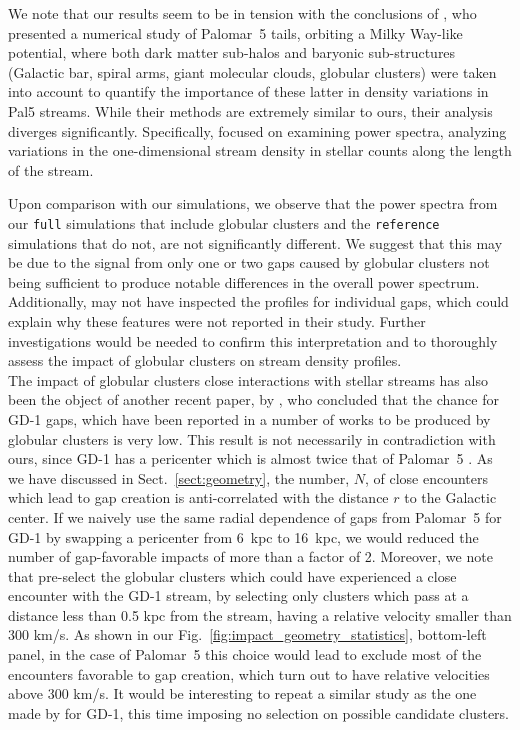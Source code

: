 \documentclass[draft]{aa}
\begin{document}
  We note that our results seem to be in tension with the conclusions of \citet{2019MNRAS.484.2009B}, who presented a numerical study of Palomar~5 tails, orbiting a Milky Way-like potential, where both dark matter sub-halos and baryonic sub-structures (Galactic bar, spiral arms, giant molecular clouds, globular clusters) were taken into account to quantify the importance of these latter in density variations in Pal5 streams. While their methods are extremely similar to ours, their analysis diverges significantly. Specifically, \citet{2019MNRAS.484.2009B} focused on examining power spectra, analyzing variations in the one-dimensional stream density in stellar counts along the length of the stream. 

  Upon comparison with our simulations, we observe that the power spectra from our \texttt{full} simulations that include globular clusters and the \texttt{reference} simulations that do not, are not significantly different. We suggest that this may be due to the signal from only one or two gaps caused by globular clusters not being sufficient to produce notable differences in the overall power spectrum. Additionally, \citet{2019MNRAS.484.2009B} may not have inspected the profiles for individual gaps, which could explain why these features were not reported in their study. Further investigations would be needed to confirm this interpretation and to thoroughly assess the impact of globular clusters on stream density profiles. \\

  The impact of globular clusters close interactions with stellar streams has also been the object of another recent paper, by \citet{2022ApJ...941..129D}, who concluded that the chance for GD-1 gaps, which have been reported in a number of works \citep[see, for example, ][]{2019ApJ...880...38B,2018MNRAS.477.1893D,2020AAS...23533607D} to be produced by globular clusters is very low. This result is not necessarily in contradiction with ours, since GD-1 has a pericenter which is almost twice that of Palomar~5 \citep[see, for example][]{2019MNRAS.486.2995M}. As we have discussed in Sect.~\ref{sect:geometry}, the number, $N$, of close encounters which lead to gap creation is anti-correlated with the distance $r$ to the Galactic center. If we naively use the same radial dependence of gaps from Palomar~5 for GD-1 by swapping a pericenter from 6~kpc to 16~kpc, we would reduced the number of gap-favorable impacts of more than a factor of 2. Moreover, we note that \citet{2022ApJ...941..129D} pre-select the globular clusters which could have experienced a close encounter with the GD-1 stream, by selecting only clusters which pass at a distance less than 0.5 kpc from the stream, having a relative velocity smaller than  300 km/s. As shown in our Fig.~\ref{fig:impact_geometry_statistics}, bottom-left panel, in the case of Palomar~5 this choice would lead to exclude most of the encounters favorable to gap creation, which turn out to have relative velocities above 300 km/s. It would be interesting to repeat a similar study as the one made by \citet{2022ApJ...941..129D} for GD-1, this time imposing no selection on possible candidate clusters.\\
  
\end{document}
